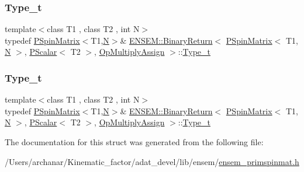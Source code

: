 \subsubsection{\texorpdfstring{Type\_t}{Type\_t}\hspace{0.1cm}{\footnotesize\ttfamily [1/2]}}
{\footnotesize\ttfamily template$<$class T1 , class T2 , int N$>$ \\
typedef \mbox{\hyperlink{classENSEM_1_1PSpinMatrix}{P\+Spin\+Matrix}}$<$T1,\mbox{\hyperlink{operator__name__util_8cc_a7722c8ecbb62d99aee7ce68b1752f337}{N}}$>$\& \mbox{\hyperlink{structENSEM_1_1BinaryReturn}{E\+N\+S\+E\+M\+::\+Binary\+Return}}$<$ \mbox{\hyperlink{classENSEM_1_1PSpinMatrix}{P\+Spin\+Matrix}}$<$ T1, \mbox{\hyperlink{operator__name__util_8cc_a7722c8ecbb62d99aee7ce68b1752f337}{N}} $>$, \mbox{\hyperlink{classENSEM_1_1PScalar}{P\+Scalar}}$<$ T2 $>$, \mbox{\hyperlink{structENSEM_1_1OpMultiplyAssign}{Op\+Multiply\+Assign}} $>$\+::\mbox{\hyperlink{structENSEM_1_1BinaryReturn_3_01PSpinMatrix_3_01T1_00_01N_01_4_00_01PScalar_3_01T2_01_4_00_01OpMultiplyAssign_01_4_a34838a8c9d99bad9b0896dde01299b03}{Type\+\_\+t}}}

\mbox{\label{structENSEM_1_1BinaryReturn_3_01PSpinMatrix_3_01T1_00_01N_01_4_00_01PScalar_3_01T2_01_4_00_01OpMultiplyAssign_01_4_a34838a8c9d99bad9b0896dde01299b03}} 
\subsubsection{\texorpdfstring{Type\_t}{Type\_t}\hspace{0.1cm}{\footnotesize\ttfamily [2/2]}}
{\footnotesize\ttfamily template$<$class T1 , class T2 , int N$>$ \\
typedef \mbox{\hyperlink{classENSEM_1_1PSpinMatrix}{P\+Spin\+Matrix}}$<$T1,\mbox{\hyperlink{operator__name__util_8cc_a7722c8ecbb62d99aee7ce68b1752f337}{N}}$>$\& \mbox{\hyperlink{structENSEM_1_1BinaryReturn}{E\+N\+S\+E\+M\+::\+Binary\+Return}}$<$ \mbox{\hyperlink{classENSEM_1_1PSpinMatrix}{P\+Spin\+Matrix}}$<$ T1, \mbox{\hyperlink{operator__name__util_8cc_a7722c8ecbb62d99aee7ce68b1752f337}{N}} $>$, \mbox{\hyperlink{classENSEM_1_1PScalar}{P\+Scalar}}$<$ T2 $>$, \mbox{\hyperlink{structENSEM_1_1OpMultiplyAssign}{Op\+Multiply\+Assign}} $>$\+::\mbox{\hyperlink{structENSEM_1_1BinaryReturn_3_01PSpinMatrix_3_01T1_00_01N_01_4_00_01PScalar_3_01T2_01_4_00_01OpMultiplyAssign_01_4_a34838a8c9d99bad9b0896dde01299b03}{Type\+\_\+t}}}



The documentation for this struct was generated from the following file\+:\begin{DoxyCompactItemize}
\item 
/\+Users/archanar/\+Kinematic\+\_\+factor/adat\+\_\+devel/lib/ensem/\mbox{\hyperlink{lib_2ensem_2ensem__primspinmat_8h}{ensem\+\_\+primspinmat.\+h}}\end{DoxyCompactItemize}
